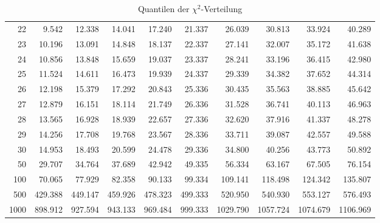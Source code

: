 \begin{table}[ht]
\begin{center}
\begin{tabular}{|r|rrr|rrr|rrr|}
22&9.542&12.338&14.041&17.240&21.337&26.039&30.813&33.924&40.289\\
23&10.196&13.091&14.848&18.137&22.337&27.141&32.007&35.172&41.638\\
24&10.856&13.848&15.659&19.037&23.337&28.241&33.196&36.415&42.980\\
25&11.524&14.611&16.473&19.939&24.337&29.339&34.382&37.652&44.314\\
26&12.198&15.379&17.292&20.843&25.336&30.435&35.563&38.885&45.642\\
27&12.879&16.151&18.114&21.749&26.336&31.528&36.741&40.113&46.963\\
28&13.565&16.928&18.939&22.657&27.336&32.620&37.916&41.337&48.278\\
29&14.256&17.708&19.768&23.567&28.336&33.711&39.087&42.557&49.588\\
30&14.953&18.493&20.599&24.478&29.336&34.800&40.256&43.773&50.892\\
50&29.707&34.764&37.689&42.942&49.335&56.334&63.167&67.505&76.154\\
100&70.065&77.929&82.358&90.133&99.334&109.141&118.498&124.342&135.807\\
500&429.388&449.147&459.926&478.323&499.333&520.950&540.930&553.127&576.493\\
1000&898.912&927.594&943.133&969.484&999.333&1029.790&1057.724&1074.679&1106.969\\
\hline
\end{tabular}
\end{center}
\caption{Quantilen der $\chi^2$-Verteilung\label{chi2-tabelle}
}
\end{table}

